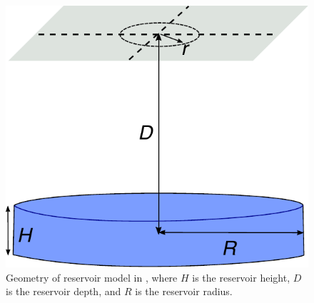 \documentclass{utexasthesis}
\begin{document}
\begin{figure}
	\centering
	\includegraphics[width=.8\textwidth]{paper1-permian/figures/supplement/figureS10-reservoir-geom.pdf}
	\caption{
		Geometry of reservoir model in \cite{Geertsma1973LandSubsidenceCompacting}, where $H$ is the reservoir height, $D$ is the reservoir depth, and $R$ is the reservoir radius.
	}
	\label{fig:model-reservoir-geom}
\end{figure}
\end{document}
